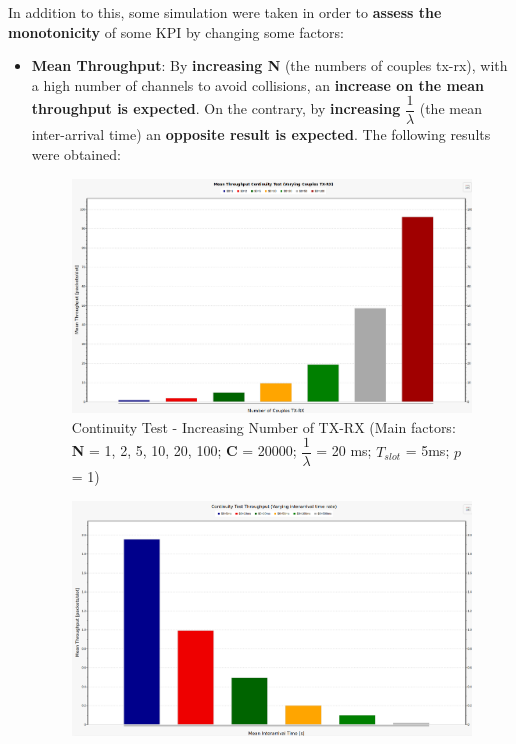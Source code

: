 \vspace{5mm}
In addition to this, some simulation were taken in order to \textbf{assess the monotonicity} of some KPI by changing some factors:
\begin{itemize}
	\item \textbf{Mean Throughput}: By \textbf{increasing N} (the numbers of couples tx-rx), with a high number of channels to avoid collisions, an \textbf{increase on the mean throughput is expected}. On the contrary, by \textbf{increasing} $\dfrac{1}{\lambda}$ (the mean inter-arrival time) an \textbf{opposite result is expected}. The following results were obtained:
	\begin{figure}[H]
		\centering
		\includegraphics[width=\textwidth]{img/continuityTest_Throughput_TXRX_Varying.png}
		\caption{Continuity Test - Increasing Number of TX-RX (Main factors: \textbf{N} = 1, 2, 5, 10, 20, 100; \textbf{C} = 20000; $\dfrac{1}{\lambda}$ = 20 ms; $T_{slot}$ = 5ms; $p$ = 1)}
		\label {img: continuityTestThTXRX}
	\end{figure}
	\begin{figure}[H]
		\centering
		\includegraphics[width=\textwidth]{img/continuityTest_Throughput_IntTimeVarying.png}

\end{figure}
\end{itemize}

